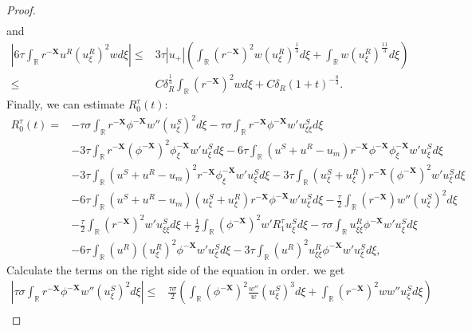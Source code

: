 \documentclass[10pt,a4paper]{amsart}
\begin{document}
\begin{proof}
\begin{equation}
\begin{aligned}
			\end{aligned}
		\end{equation}
		and
		\begin{equation}\label{N14}
			\begin{aligned}
				\left|6\tau\int_{\mathbb{R}}r^{-\mathbf{X}}u^R(u_{\xi}^R)^2wd\xi\right|\leq&3\tau|u_+|\left(\int_{\mathbb{R}}(r^{-\mathbf{X}})^2w(u_{\xi}^R)^{\frac{1}{3}}d\xi+\int_{\mathbb{R}}w(u_{\xi}^R)^{\frac{11}{3}}d\xi\right)\\
				\leq&C\delta_R^{\frac{1}{3}}\int_{\mathbb{R}}(r^{-\mathbf{X}})^2wd\xi+C\delta_R(1+t)^{-\frac{8}{3}}.
			\end{aligned}
		\end{equation}
		Finally, we can estimate $R_0^{\tau}(t)$:
		\begin{equation*}
			\begin{aligned}
				R_{0}^{\tau}(t)=&- \tau\sigma\int_{\mathbb{R}}r^{-\mathbf{X}}\phi^{-\mathbf{X}}w''\left(u_{\xi}^{S}\right)^{2}d\xi-\tau\sigma\int_{\mathbb{R}}r^{-\mathbf{X}}\phi^{-\mathbf{X}}w'u^S_{\xi\xi}d\xi\\
				&-3\tau\int_{\mathbb{R}}r^{-\mathbf{X}}(\phi^{-\mathbf{X}})^{2}\phi_{\xi}^{-\mathbf{X}}w'u_{\xi}^{S}d\xi -6\tau\int_{\mathbb{R}}(u^{S}+u^{R}-u_{m})r^{-\mathbf{X}}\phi^{-\mathbf{X}}\phi_{\xi}^{-\mathbf{X}}w'u_{\xi}^{S}d\xi\\
				&-3\tau\int_{\mathbb{R}}(u^{S}+u^{R}-u_{m})^{2}r^{-\mathbf{X}}\phi_{\xi}^{-\mathbf{X}}w'u_{\xi}^{S}d\xi-3\tau\int_{\mathbb{R}}(u_{\xi}^{S}+u_{\xi}^{R})r^{-\mathbf{X}}(\phi^{-\mathbf{X}})^{2}w'u_{\xi}^{S}d\xi\\
				&-6\tau\int_{\mathbb{R}}(u^{S}+u^{R}-u_{m})(u_{\xi}^{S}+u_{\xi}^{R})r^{-\mathbf{X}}\phi^{-\mathbf{X}}w'u_{\xi}^{S}d\xi-\frac{\tau}{2}\int_{\mathbb{R}}(r^{-\mathbf{X}})w''(u_{\xi}^{S})^{2}d\xi\\
				&-\frac{\tau}{2}\int_{\mathbb{R}}(r^{-\mathbf{X}})^{2}w'u_{\xi\xi}^Sd\xi+\frac{1}{2}\int_{\mathbb{R}}(\phi^{-\mathbf{X}})^{2}w'R_{1}^{\tau}u_{\xi}^{S}d\xi-\tau\sigma\int_{\mathbb{R}}u_{\xi\xi}^R\phi^{-\mathbf{X}}w'u_{\xi}^Sd\xi\\
				&- 6\tau\int_{\mathbb{R}}(u^{R})(u_{\xi}^{R})^{2}\phi^{-\mathbf{X}}w'u_{\xi}^{S}d\xi-3\tau\int_{\mathbb{R}}(u^{R})^{2}u_{\xi\xi}^{R}\phi^{-\mathbf{X}}w'u_{\xi}^{S}d\xi,
			\end{aligned}
		\end{equation*}
		Calculate the terms on the right side of the equation in order. we get
		\begin{align*}
			\left|\tau\sigma\int_{\mathbb{R}}r^{-\mathbf{X}}\phi^{-\mathbf{X}}w''\left(u_{\xi}^{S}\right)^{2}d\xi\right|\leq& \frac{\tau\sigma}{2}\left(\int_{\mathbb{R}}(\phi^{-\mathbf{X}})^2\frac{w''}{w}(u^S_{\xi})^3d\xi+\int_{\mathbb{R}}(r^{-\mathbf{X}})^2ww''u^S_{\xi}d\xi\right)\\

\end{align*}
\end{proof}
\end{document}
